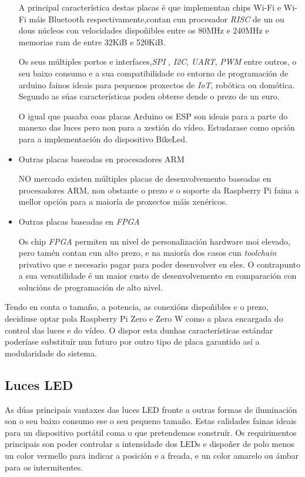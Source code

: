 \begin{itemize}
A principal característica destas placas é que implementan chips Wi-Fi e Wi-Fi máis Bluetooth respectivamente,contan cun procesador \emph{RISC} de un ou dous núcleos con velocidades dispoñibles entre os 80MHz e 240MHz e memorias ram de entre 32KiB e 520KiB.

Os seus múltiples portos e interfaces,\emph{SPI} ,  \emph{I2C}, \emph{UART}, \emph{PWM} entre outros, o seu baixo consumo e a sua compatibilidade co entorno de programación de arduino fainos ideais para pequenos proxectos de \emph{IoT}, robótica ou domótica. Segundo as súas características poden obterse dende o prezo de un euro.

O igual que pasaba coas placas Arduino os ESP son ideais para a parte do manexo das luces pero non para a xestión do vídeo. Estudarase como opción para a implementación do dispositivo BikeLed.
    \item Outras placas baseadas en procesadores ARM

NO mercado existen múltiples placas de desenvolvemento baseadas en procesadores ARM, non obstante o prezo e o soporte da Raspberry Pi faina a mellor opción para a maioría de proxectos máis xenéricos.
    \item Outras placas baseadas en \emph{FPGA}

Os chip \emph{FPGA} permiten un nivel de personalización hardware moi elevado, pero tamén contan cun alto prezo, e na maioría dos casos cun \emph{toolchain} privativo que e necesario pagar para poder desenvolver en eles. O contrapunto a sua versatilidade é un maior custo de desenvolvemento en comparación con solucións de programación de alto nivel.
\end{itemize}
Tendo en conta o tamaño, a potencia, as conexións dispoñibles e o prezo, decidiuse optar pola Raspberry Pi Zero e Zero W como a placa encargada do control das luces e do vídeo. O dispor esta dunhas características estándar poderíase substituír nun futuro por outro tipo de placa garantido así a modularidade do sistema.

\subsection{Luces LED}
As dúas principais vantaxes das luces LED fronte a outras formas de iluminación son o seu baixo consumo ese o seu pequeno tamaño. Estas calidades fainas ideais para un dispositivo portátil coma o que pretendemos construír.
Os requirimentos principais son poder controlar a intensidade dos LEDs e dispoñer de polo menos un color vermello para indicar a posición e a freada, e un color amarelo ou ámbar para os intermitentes.

